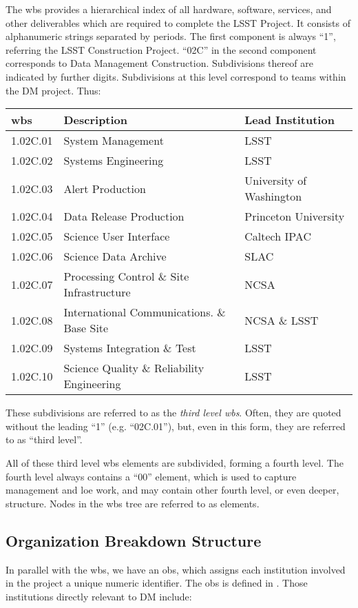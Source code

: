 The \gls{wbs} provides a hierarchical index of all hardware, software, services, and other deliverables which are required to complete the LSST Project.
It consists of alphanumeric strings separated by periods.
The first component is always ``1'', referring the LSST Construction Project.
``02C'' in the second component corresponds to Data Management Construction.
Subdivisions thereof are indicated by further digits.
Subdivisions at this level correspond to teams within the DM project.
Thus:

\begin{longtable}[]{@{}lll@{}}
\hline
\gls{wbs} & Description & Lead Institution\tabularnewline
\hline
\endhead
1.02C.01 & System Management & LSST\tabularnewline
1.02C.02 & Systems Engineering & LSST\tabularnewline
1.02C.03 & Alert Production & University of Washington\tabularnewline
1.02C.04 & Data Release Production & Princeton University\tabularnewline
1.02C.05 & Science User Interface & Caltech IPAC\tabularnewline
1.02C.06 & Science Data Archive & SLAC\tabularnewline
1.02C.07 & Processing Control \& Site Infrastructure &
NCSA\tabularnewline
1.02C.08 & International Communications. \& Base Site & NCSA \&
LSST\tabularnewline
1.02C.09 & Systems Integration \& Test & LSST\tabularnewline
1.02C.10 & Science Quality \& Reliability Engineering &
LSST\tabularnewline
\hline
\end{longtable}

These subdivisions are referred to as the \emph{third level \gls{wbs}}.
Often, they are quoted without the leading ``1'' (e.g. ``02C.01''), but, even in this form, they are referred to as ``third level''.

All of these third level \gls{wbs} \glspl{element} are subdivided, forming a fourth level.
The fourth level always contains a ``00'' \gls{element}, which is used to capture management and \gls{loe} work, and may contain other fourth level, or even deeper, structure.
Nodes in the \gls{wbs} tree are referred to as \glspl{element}.

\subsection{Organization Breakdown
Structure}\label{organization-breakdown-structure}

In parallel with the \gls{wbs}, we have an \gls{obs}, which assigns each institution involved in the project a unique numeric identifier.
The \gls{obs} is defined in .
Those institutions directly relevant to DM include:

